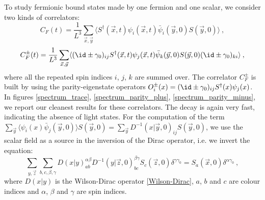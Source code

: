 To study fermionic bound states made by one fermion and one scalar, we consider two kinds of correlators:
\begin{equation}
C_F(t) =  \frac{1}{L^3} \sum_{\vec x,\vec y} \langle S^{\dagger}(\vec x, t) \psi_i(\vec x, t) \bar\psi_i(\vec y,0) S(\vec y,0) \rangle \: ,
\label{corr_trace}
\end{equation}
\begin{equation}
C^{\pm}_F(t) = \frac{1}{L^3} \sum_{\vec x,\vec y}\langle (\id \pm\gamma_0)_{ij} S^{\dagger}(\vec x,t) \psi_j(\vec x,t)\bar\psi_k(\vec y,0)S(\vec y,0) (\id \pm \gamma_0)_{ki} \rangle \: ,
\label{corr_pm}
\end{equation}
%
where all the repeated spin indices $i$, $j$, $k$ are summed over. The correlator $C^{\pm}_F$ is built by using the parity-eigenstate operators $O^{\pm}_i(x) = (\id \pm \gamma_0)_{ij} S^{\dagger}(x) \psi_j (x)$. In figures \ref{spectrum_trace}, \ref{spectrum_parity_plus}, \ref{spectrum_parity_minus}, we report our cleanest results for these correlators. The decay is again very fast, indicating the absence of light states. For the computation of the term $\sum_{\vec y}\langle \psi_i(x) \bar \psi_j(\vec y, 0)  \rangle S(\vec y,0) = \sum_{\vec y}D^{-1}(x \vert \vec y,0)_{ij} S(\vec y, 0)$, we use the scalar field as a source in the inversion of the Dirac operator, i.e. we invert the equation:
\begin{equation}
\sum_{y,\vec z} \sum_{b,c,\beta, \gamma} D(x \vert y)_{a b}^{\alpha \beta}D^{-1}(y \vert \vec z, 0)_{b c}^{\beta \gamma} S_c(\vec z,0) \delta^{\gamma \gamma_0} = S_a(\vec x,0)\delta^{\alpha \gamma_0} \: ,
\end{equation}
%
where $D(x \vert y)$ is the Wilson-Dirac operator \ref{Wilson-Dirac}, $a$, $b$ and $c$ are colour indices and $\alpha$, $\beta$ and $\gamma$ are spin indices.
